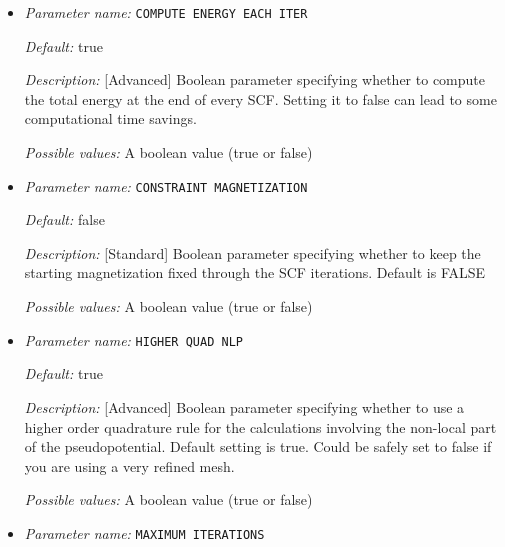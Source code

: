 \begin{itemize}
\item {\it Parameter name:} {\tt COMPUTE ENERGY EACH ITER}
\label{parameters:SCF parameters/COMPUTE ENERGY EACH ITER}
\label{parameters:SCF_20parameters/COMPUTE_20ENERGY_20EACH_20ITER}




{\it Default:} true


{\it Description:} [Advanced] Boolean parameter specifying whether to compute the total energy at the end of every SCF. Setting it to false can lead to some computational time savings.


{\it Possible values:} A boolean value (true or false)
\item {\it Parameter name:} {\tt CONSTRAINT MAGNETIZATION}
\label{parameters:SCF parameters/CONSTRAINT MAGNETIZATION}
\label{parameters:SCF_20parameters/CONSTRAINT_20MAGNETIZATION}




{\it Default:} false


{\it Description:} [Standard] Boolean parameter specifying whether to keep the starting magnetization fixed through the SCF iterations. Default is FALSE


{\it Possible values:} A boolean value (true or false)
\item {\it Parameter name:} {\tt HIGHER QUAD NLP}
\label{parameters:SCF parameters/HIGHER QUAD NLP}
\label{parameters:SCF_20parameters/HIGHER_20QUAD_20NLP}




{\it Default:} true


{\it Description:} [Advanced] Boolean parameter specifying whether to use a higher order quadrature rule for the calculations involving the non-local part of the pseudopotential. Default setting is true. Could be safely set to false if you are using a very refined mesh.


{\it Possible values:} A boolean value (true or false)
\item {\it Parameter name:} {\tt MAXIMUM ITERATIONS}
\label{parameters:SCF parameters/MAXIMUM ITERATIONS}
\label{parameters:SCF_20parameters/MAXIMUM_20ITERATIONS}



\end{itemize}
